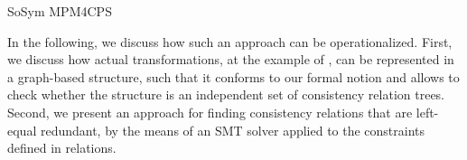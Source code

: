 \begin{copiedFrom}{SoSym MPM4CPS}

In the following, we discuss how such an approach can be operationalized.
First, we discuss how actual transformations, at the example of \qvtr, can be represented in a graph-based structure, such that it conforms to our formal notion and allows to check whether the structure is an independent set of consistency relation trees.
Second, we present an approach for finding consistency relations that are left-equal redundant, by the means of an SMT solver applied to the constraints defined in \qvtr relations.






\end{copiedFrom} %